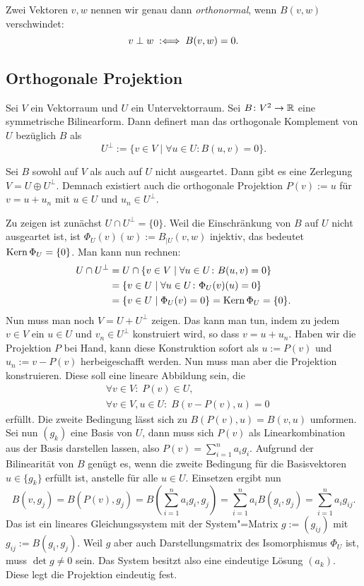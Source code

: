 Zwei Vektoren $v,w$ nennen wir genau dann \emph{orthonormal},
wenn $B(v,w)$ verschwindet:%
\begin{equation}
v\perp w \;:\Longleftrightarrow\; B(v,w)=0.
\end{equation}

\subsection{Orthogonale Projektion}

Sei $V$ ein Vektorraum und $U$ ein Untervektorraum. Sei
$B\colon V^2\to\mathbb R$ eine symmetrische Bilinearform. Dann definert
man das orthogonale Komplement
von $U$ bezüglich $B$ als
\begin{equation}
U^\perp := \{v\in V\mid \forall u\in U\colon B(u,v)=0\}.
\end{equation}
\begin{theorem}
Sei $B$ sowohl auf $V$ als auch auf $U$ nicht ausgeartet.
Dann gibt es eine Zerlegung $V=U\oplus U^\perp$. Demnach
existiert auch die orthogonale Projektion $P(v):=u$
für $v=u+u_n$ mit $u\in U$ und $u_n\in U^\perp$.
\end{theorem}
 Zu zeigen ist zunächst $U\cap U^\perp=\{0\}$.
Weil die Einschränkung von $B$ auf $U$ nicht ausgeartet ist, ist
$\Phi_U(v)(w):=B_{|U}(v,w)$ injektiv, das bedeutet
$\operatorname{Kern}\Phi_U=\{0\}$. Man kann nun rechnen:
\begin{align}
U\cap U^\perp &= U\cap\{v\in V\mid \forall u\in U\colon B(u,v)=0\}\\
&= \{v\in U\mid\forall u\in U\colon\Phi_U(v)(u)=0\}\\
&= \{v\in U\mid \Phi_U(v)=0\} = \operatorname{Kern}\Phi_U = \{0\}.
\end{align}
Nun muss man noch $V=U+U^\perp$ zeigen. Das kann man tun, indem
zu jedem $v\in V$ ein $u\in U$ und $v_n\in U^\perp$ konstruiert
wird, so dass $v=u+u_n$. Haben wir die Projektion $P$ bei Hand,
kann diese Konstruktion sofort als $u:=P(v)$ und $u_n:=v-P(v)$
herbeigeschafft werden. Nun muss man aber die Projektion
konstruieren. Diese soll eine lineare Abbildung sein, die%
\begin{align}
&\forall v\in V\colon\; P(v)\in U,\\
&\forall v\in V, u\in U\colon\; B(v-P(v),u) = 0
\end{align}
erfüllt. Die zweite Bedingung lässt sich zu $B(P(v),u)=B(v,u)$
umformen. Sei nun $(g_k)$ eine Basis von $U$, dann muss sich
$P(v)$ als Linearkombination aus der Basis darstellen lassen,
also $P(v)=\sum_{i=1}^n a_i g_i$. Aufgrund der Bilinearität von $B$
genügt es, wenn die zweite Bedingung für die Basisvektoren
$u\in\{g_k\}$ erfüllt ist, anstelle für alle $u\in U$. Einsetzen
ergibt nun
\begin{equation}
B(v,g_j) = B(P(v),g_j) = B(\sum_{i=1}^n a_i g_i,g_j)
= \sum_{i=1}^n a_i B(g_i,g_j) = \sum_{i=1}^n a_i g_{ij}.
\end{equation}
Das ist ein lineares Gleichungssystem mit der System"=Matrix
$g:=(g_{ij})$ mit $g_{ij}:=B(g_i,g_j)$. Weil $g$ aber auch
Darstellungsmatrix des Isomorphismus $\Phi_U$ ist, muss $\det g\ne 0$
sein. Das System besitzt also eine eindeutige Lösung $(a_k)$. Diese
legt die Projektion eindeutig fest.\;\qedsymbol



